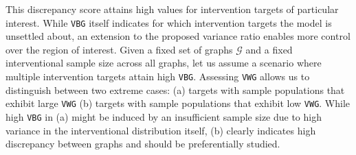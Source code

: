 \documentclass[nohyperref]{article}
\theoremstyle{plain}
\theoremstyle{definition}
\theoremstyle{remark}
\begin{document}
This discrepancy score attains high values for intervention targets of particular interest. While \texttt{VBG} itself indicates for which intervention targets the model is unsettled about, an extension to the proposed variance ratio enables more control over the region of interest. Given a fixed set of graphs $\mathcal{G}$ and a fixed interventional sample size across all graphs, let us assume a scenario where multiple intervention targets attain high \texttt{VBG}. Assessing \texttt{VWG} allows us to distinguish between two extreme cases: (a) targets with sample populations that exhibit large \texttt{VWG} (b) targets with sample populations that exhibit low \texttt{VWG}. While high \texttt{VBG} in (a) might be induced by an insufficient sample size due to high variance in the interventional distribution itself, (b) clearly indicates high discrepancy between graphs and should be preferentially studied. 

\vspace{-2mm}
\end{document}
